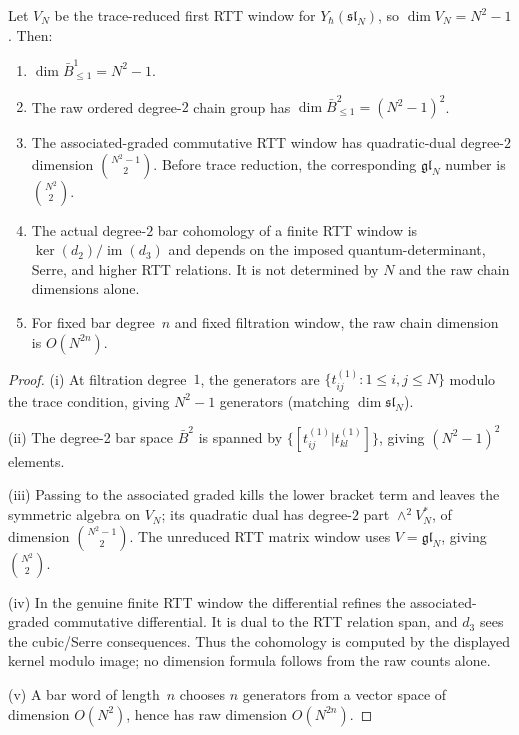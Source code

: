 \begin{proposition}
\label{prop:yangian-rank-dependence}

Let $V_N$ be the trace-reduced first RTT window for
$Y_\hbar(\mathfrak{sl}_N)$, so
$\dim V_N=N^2-1$. Then:
\begin{enumerate}
\item $\dim \bar{B}^1_{\leq 1}=N^2-1$.
\item The raw ordered degree-$2$ chain group has
 $\dim \bar{B}^2_{\leq 1}=(N^2-1)^2$.
\item The associated-graded commutative RTT window has quadratic-dual
 degree-$2$ dimension $\binom{N^2-1}{2}$. Before trace reduction,
 the corresponding $\mathfrak{gl}_N$ number is $\binom{N^2}{2}$.
\item The actual degree-$2$ bar cohomology of a finite RTT window is
 $\ker(d_2)/\operatorname{im}(d_3)$ and depends on the imposed
 quantum-determinant, Serre, and higher RTT relations. It is not
 determined by $N$ and the raw chain dimensions alone.
\item For fixed bar degree~$n$ and fixed filtration window, the raw
 chain dimension is $O(N^{2n})$.
\end{enumerate}
\end{proposition}

\begin{proof}
(i) At filtration degree~$1$, the generators are
$\{t_{ij}^{(1)} : 1 \leq i,j \leq N\}$ modulo the trace
condition, giving $N^2 - 1$ generators (matching $\dim \mathfrak{sl}_N$).

(ii) The degree-2 bar space $\bar{B}^2$ is spanned by
$\{[t_{ij}^{(1)} | t_{kl}^{(1)}]\}$, giving $(N^2-1)^2$ elements.

(iii) Passing to the associated graded kills the lower bracket term
and leaves the symmetric algebra on $V_N$; its quadratic dual has
degree-$2$ part $\wedge^2 V_N^*$, of dimension $\binom{N^2-1}{2}$.
The unreduced RTT matrix window uses $V=\mathfrak{gl}_N$, giving
$\binom{N^2}{2}$.

(iv) In the genuine finite RTT window the differential refines
the associated-graded commutative differential. It is dual to the
RTT relation span, and $d_3$ sees the cubic/Serre consequences.
Thus the cohomology is computed by the displayed kernel modulo image;
no dimension formula follows from the raw counts alone.

(v) A bar word of length~$n$ chooses $n$ generators from a vector
space of dimension $O(N^2)$, hence has raw dimension $O(N^{2n})$.
\end{proof}

